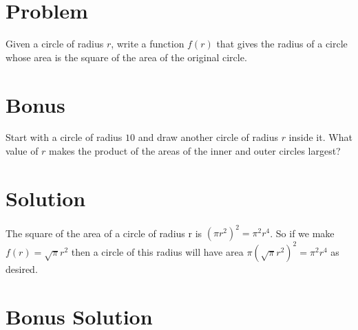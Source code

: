 \documentclass[11pt,a4paper]{report}
\theoremstyle{plain}
\theoremstyle{definition}
\theoremstyle{remark}
\begin{document}
\section*{Problem} Given a circle of radius $r$, write a function $f(r)$ that
gives the radius of a circle whose area is the square of the area of the
original circle.

\section*{Bonus} Start with a circle of radius $10$ and draw another circle of
radius $r$ inside it.  What value of $r$ makes the product of the areas
of the inner and outer circles largest?

\section*{Solution} The square of the area of a circle of radius r is
$( \pi r^2)^2 = \pi^2r^4$.   So if we make $f(r) = \sqrt{\pi}r^2$ then a circle
of this radius will  have area $\pi(\sqrt{\pi}r^2)^2 = \pi^2r^4$ as desired.

\section*{Bonus Solution}
 
 
\end{document}

